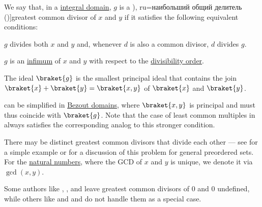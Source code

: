 \begin{definition}\label{def:gcd}
  We say that, in a \hyperref[def:integral_domain]{integral domain}, \( g \) is a \term[bg=най-голям общ делител (\cite[def. II.2]{ГеновИПр1991Алгебра}), ru=наибольший общий делитель (\cite[def. 3.5.3]{Винберг2014Алгебра})]{greatest common divisor} of \( x \) and \( y \) if it satisfies the following equivalent conditions:

  \begin{thmenum}
     \( g \) divides both \( x \) and \( y \) and, whenever \( d \) is also a common divisor, \( d \) divides \( g \).

     \( g \) is an \hyperref[def:extremal_points/supremum_and_infimum]{infimum} of \( x \) and \( y \) with respect to the \hyperref[thm:semiring_divisibility_order]{divisibility order}.

     The ideal \( \braket{ g } \) is the smallest principal ideal that contains the join \( \braket{ x } + \braket{ y } = \braket{ x, y } \) of \( \braket{ x } \) and \( \braket{ y } \).
  \end{thmenum}
\end{definition}
\begin{comments}
  \item {} can be simplified in \hyperref[def:bezout_domain]{Bezout domains}, where \( \braket{ x, y } \) is principal and must thus coincide with \( \braket{ g } \). Note that the case of least common multiples in  always satisfies the corresponding analog to this stronger condition.

  \item There may be distinct greatest common divisors that divide each other --- see  for a simple example or  for a discussion of this problem for general preordered sets. For the \hyperref[def:natural_numbers]{natural numbers}, where the GCD of \( x \) and \( y \) is unique, we denote it via \( \gcd(x, y) \).

  \item Some authors like , ,  and  leave greatest common divisors of \( 0 \) and \( 0 \) undefined, while others like  and  and  do not handle them as a special case.
\end{comments}
